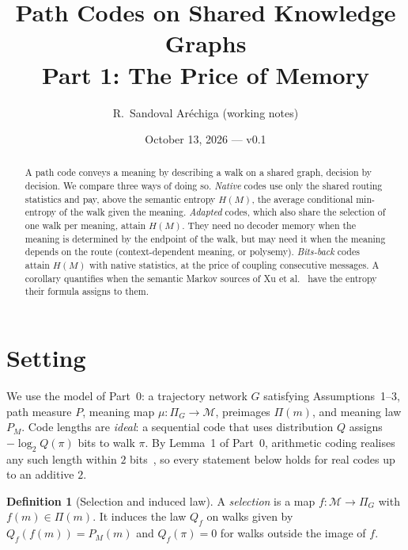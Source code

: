 \documentclass[11pt]{article}
\title{Path Codes on Shared Knowledge Graphs\\[2pt]\large Part 1: The Price of Memory}
\author{R.~Sandoval Ar\'echiga (working notes)}
\date{October 13, 2026 --- v0.1}
\theoremstyle{definition}
\newtheorem{definition}{Definition}
\theoremstyle{remark}
\newcommand{\M}{\mathcal{M}}
\newcommand{\Pset}{\Pi}
\begin{document}
\maketitle

\begin{abstract}
A path code conveys a meaning by describing a walk on a shared graph, decision by decision. We compare three ways of doing so. \emph{Native} codes use only the shared routing statistics and pay, above the semantic entropy $H(M)$, the average conditional min-entropy of the walk given the meaning. \emph{Adapted} codes, which also share the selection of one walk per meaning, attain $H(M)$. They need no decoder memory when the meaning is determined by the endpoint of the walk, but may need it when the meaning depends on the route (context-dependent meaning, or polysemy). \emph{Bits-back} codes attain $H(M)$ with native statistics, at the price of coupling consecutive messages. A corollary quantifies when the semantic Markov sources of Xu et al.~\cite{xu2025} have the entropy their formula assigns to them.
\end{abstract}

\section{Setting}

We use the model of Part~0: a trajectory network $G$ satisfying Assumptions~1--3, path measure $P$, meaning map $\mu:\Pset_G\to\M$, preimages $\Pset(m)$, and meaning law $P_M$. Code lengths are \emph{ideal}: a sequential code that uses distribution $Q$ assigns $-\log_2 Q(\pi)$ bits to walk $\pi$. By Lemma~1 of Part~0, arithmetic coding realises any such length within $2$ bits~\cite{rissanen1979,witten1987}, so every statement below holds for real codes up to an additive $2$.

\begin{definition}[Selection and induced law]
A \emph{selection} is a map $f:\M\to\Pset_G$ with $f(m)\in\Pset(m)$. It induces the law $Q_f$ on walks given by $Q_f(f(m))=P_M(m)$ and $Q_f(\pi)=0$ for walks outside the image of $f$.
\end{definition}
\end{document}
